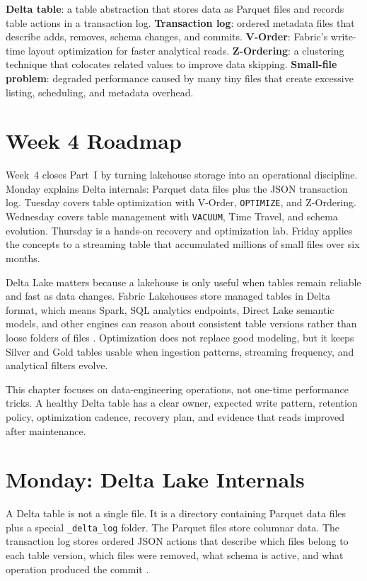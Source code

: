 \begin{keyterms}
\textbf{Delta table}: a table abstraction that stores data as Parquet files and records table actions in a transaction log. \quad
\textbf{Transaction log}: ordered metadata files that describe adds, removes, schema changes, and commits. \quad
\textbf{V-Order}: Fabric's write-time layout optimization for faster analytical reads. \quad
\textbf{Z-Ordering}: a clustering technique that colocates related values to improve data skipping. \quad
\textbf{Small-file problem}: degraded performance caused by many tiny files that create excessive listing, scheduling, and metadata overhead.
\end{keyterms}

\section{Week 4 Roadmap}
Week~4 closes Part~I by turning lakehouse storage into an operational discipline. Monday explains Delta internals: Parquet data files plus the JSON transaction log. Tuesday covers table optimization with V-Order, \texttt{OPTIMIZE}, and Z-Ordering. Wednesday covers table management with \texttt{VACUUM}, Time Travel, and schema evolution. Thursday is a hands-on recovery and optimization lab. Friday applies the concepts to a streaming table that accumulated millions of small files over six months.

Delta Lake matters because a lakehouse is only useful when tables remain reliable and fast as data changes. Fabric Lakehouses store managed tables in Delta format, which means Spark, SQL analytics endpoints, Direct Lake semantic models, and other engines can reason about consistent table versions rather than loose folders of files \cite{microsoftFabricLakehouse,deltaLakeDocs}. Optimization does not replace good modeling, but it keeps Silver and Gold tables usable when ingestion patterns, streaming frequency, and analytical filters evolve.

\begin{notebox}
This chapter focuses on data-engineering operations, not one-time performance tricks. A healthy Delta table has a clear owner, expected write pattern, retention policy, optimization cadence, recovery plan, and evidence that reads improved after maintenance.
\end{notebox}

\section{Monday: Delta Lake Internals}
A Delta table is not a single file. It is a directory containing Parquet data files plus a special \texttt{\_delta\_log} folder. The Parquet files store columnar data. The transaction log stores ordered JSON actions that describe which files belong to each table version, which files were removed, what schema is active, and what operation produced the commit \cite{armbrust2020delta,apacheParquet}.

